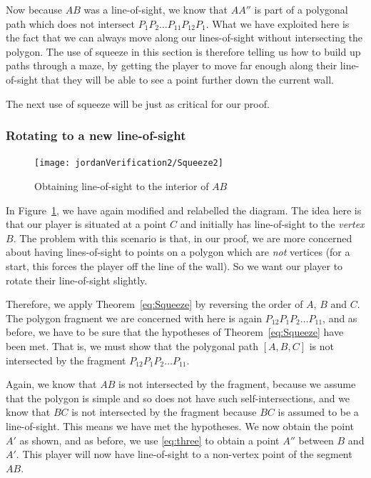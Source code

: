 Now because $AB$ was a line-of-sight, we know that $AA''$ is part of a polygonal path which does not intersect $P_1P_2\ldots P_{11}P_{12}P_{1}$. What we have exploited here is the fact that we can always move along our lines-of-sight without intersecting the polygon. The use of squeeze in this section is therefore telling us how to build up paths through a maze, by getting the player to move far enough along their line-of-sight that they will be able to see a point further down the current wall. 

The next use of squeeze will be just as critical for our proof.

\subsubsection{Rotating to a new line-of-sight}\label{sec:RotateToNew}
\begin{figure}
\centering\texttt{[image: jordanVerification2/Squeeze2]}
\caption{Obtaining line-of-sight to the interior of $AB$}
\label{fig:Squeeze2}
\end{figure}
In Figure~\ref{fig:Squeeze2}, we have again modified and relabelled the diagram. The idea here is that our player is situated at a point $C$ and initially has line-of-sight to the \emph{vertex} $B$. The problem with this scenario is that, in our proof, we are more concerned about having lines-of-sight to points on a polygon which are \emph{not} vertices (for a start, this forces the player off the line of the wall).  So we want our player to rotate their line-of-sight slightly. 

Therefore, we apply Theorem~\ref{eq:Squeeze} by reversing the order of $A$, $B$ and $C$. The polygon fragment we are concerned with here is again $P_{12}P_1P_2\ldots P_{11}$, and as before, we have to be sure that the hypotheses of Theorem~\ref{eq:Squeeze} have been met. That is, we must show that the polygonal path $[A,B,C]$ is not intersected by the fragment $P_{12}P_1P_2\ldots P_{11}$. 

Again, we know that $AB$ is not intersected by the fragment, because we assume that the polygon is simple and so does not have such self-intersections, and we know that $BC$ is not intersected by the fragment because $BC$ is assumed to be a line-of-sight. This means we have met the hypotheses. We now obtain the point $A'$ as shown, and as before, we use \ref{eq:three} to obtain a point $A''$ between $B$ and $A'$. This player will now have line-of-sight to a non-vertex point of the segment $AB$.

